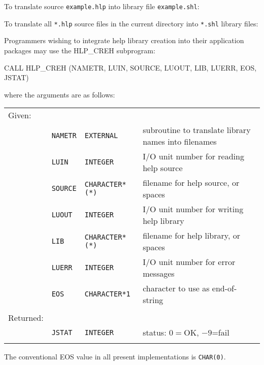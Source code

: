 \documentclass[11pt,nolof]{starlink}
\begin{document}
To translate source \texttt{example.hlp} into library file \texttt{example.shl}:
\begin{terminalv}
\end{terminalv}
To translate all \texttt{*.hlp} source files in the current directory
into \texttt{*.shl} library files:
\begin{terminalv}
\end{terminalv}

Programmers wishing to integrate help library creation into their
application packages may use the HLP\_CREH subprogram:
\begin{terminalv}
CALL HLP_CREH (NAMETR, LUIN, SOURCE, LUOUT, LIB, LUERR, EOS, JSTAT)
\end{terminalv}
where the arguments are as follows:

\begin{tabular}{llll}
\\
Given: \\
& \texttt{NAMETR} & \texttt{EXTERNAL} &
              subroutine to translate library names into filenames \\
& \texttt{LUIN} & \texttt{INTEGER} &
                           I/O unit number for reading help source \\
& \texttt{SOURCE} & \texttt{CHARACTER*(*)} &
                               filename for help source, or spaces \\
& \texttt{LUOUT} & \texttt{INTEGER} &
                          I/O unit number for writing help library \\
& \texttt{LIB} & \texttt{CHARACTER*(*)} &
                              filename for help library, or spaces \\
& \texttt{LUERR} & \texttt{INTEGER} &
                                I/O unit number for error messages \\
& \texttt{EOS} & \texttt{CHARACTER*1} &
                                 character to use as end-of-string \\ \\
Returned: \\
& \texttt{JSTAT} & \texttt{INTEGER} &
                                         status: $0=$OK, $-9$=fail \\ \\
\end{tabular}

The conventional EOS value in all present implementations is \texttt{CHAR(0)}.
\end{document}

